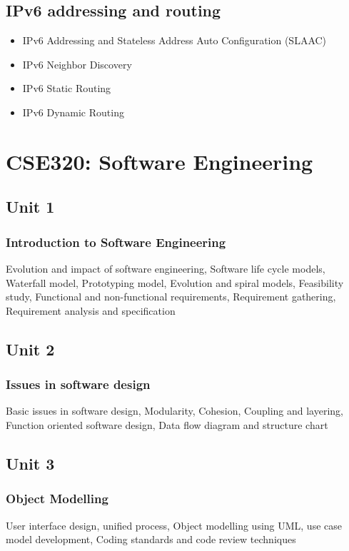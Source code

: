 \documentclass[twocolumn]{article}
\begin{document}
    \subsection*{IPv6 addressing and routing}
    \begin{itemize}
        \item IPv6 Addressing and Stateless Address Auto Configuration (SLAAC)
        \item IPv6 Neighbor Discovery
        \item IPv6 Static Routing
        \item IPv6 Dynamic Routing
    \end{itemize}
    \section*{CSE320: Software Engineering}
    \subsection*{Unit 1}
    \subsubsection*{Introduction to Software Engineering}
    Evolution and impact of software engineering, Software life cycle models, Waterfall model, Prototyping model, Evolution and spiral models, Feasibility study, Functional and non-functional requirements, Requirement gathering, Requirement analysis and specification
    \subsection*{Unit 2}
    \subsubsection*{Issues in software design}
    Basic issues in software design, Modularity, Cohesion, Coupling and layering, Function oriented software design, Data flow diagram and structure chart
    \subsection*{Unit 3}
    \subsubsection*{Object Modelling}
    User interface design, unified process, Object modelling using UML, use case model development, Coding standards and code review techniques
\end{document}
